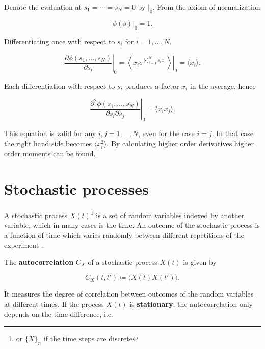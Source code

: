 Denote the evaluation at $s_1=\dotsb=s_N=0$ by $|_0$. From the axiom of normalization

\begin{equation*}
  \phi(s)|_0 = 1.
\end{equation*}

Differentiating once with respect to $s_i$ for $i=1,\dotsc,N$.

\begin{equation*}
  \left.\frac{\partial\phi(s_1,\dotsc,s_N)}{\partial s_i}\right|_0 = \left.\left\langle x_i e^{\sum_{i=1}^Ns_ix_i}\right\rangle\right|_0 = \langle x_i\rangle.
\end{equation*}

Each differentiation with respect to $s_i$ produces a factor $x_i$ in the average, hence

\begin{equation*}
  \left.\frac{\partial^2\phi(s_1,\dotsc,s_N)}{\partial s_i \partial s_j}\right|_0 = \langle x_ix_j\rangle.
\end{equation*}

This equation is valid for any $i,j=1,\dotsc,N$, even for the case $i=j$. In that case the right hand side becomes $\langle x_i^2\rangle$. By calculating higher order derivatives higher order moments can be found.
  
\section{Stochastic processes}

A stochastic process $X(t)$\footnote{or $\{X\}_n$ if the time steps are discrete} is a set of random variables indexed by another variable, which in many cases is the time. An outcome of the stochastic process is a function of time which varies randomly between different repetitions of the experiment \cite{vankampen92} \cite{gardiner03}.

The \textbf{autocorrelation} $C_X$ of a stochastic process $X(t)$ is given by

\begin{equation*}
  C_X(t,t') \coloneqq \langle X(t)X(t')\rangle.
\end{equation*}

It measures the degree of correlation between outcomes of the random variables at different times. If the process $X(t)$ is \textbf{stationary}, the autocorrelation only depends on the time difference, i.e.


